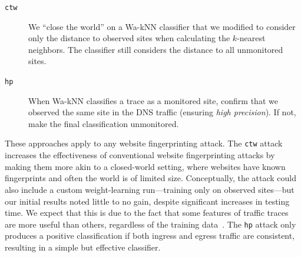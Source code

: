 \begin{description}
	\item[\texttt{ctw}] We ``close the world''
	on a Wa-kNN classifier that we modified to consider only the distance to
	observed sites when calculating the $k$-nearest neighbors.
	The classifier still considers the distance to all unmonitored sites.
	\item[\texttt{hp}] When Wa-kNN classifies a trace as a monitored site, confirm
	that we observed the same site in the DNS traffic (ensuring {\em high
	precision}). If not, make the final classification unmonitored.
\end{description}
\noindent
These approaches apply to any website fingerprinting attack. The
\texttt{ctw} attack increases the effectiveness of conventional website
fingerprinting attacks by making them more akin to a closed-world setting,
where websites have known fingerprints and often the world is of limited size.
Conceptually, the attack could also include
a custom weight-learning run---training only on observed sites---but our initial
results noted little to no gain, despite significant increases in
testing time.
We expect that this is due to the fact that some features of traffic traces are
more useful than others, regardless of the training data~\cite{Hayes2016a}.
The \texttt{hp} attack only produces a positive classification if both ingress
and egress traffic are consistent, resulting in a simple but effective
classifier.
